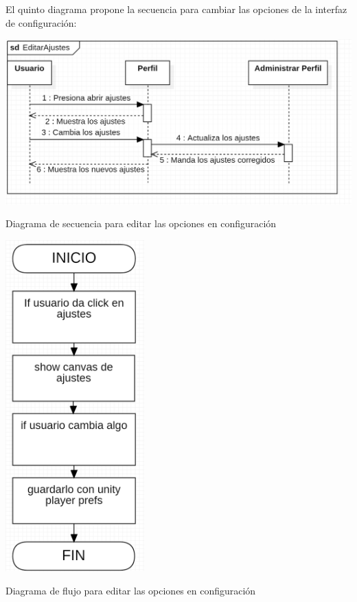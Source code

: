 \documentclass[12pt, oneside, letterpaper]{book}
\begin{document}
\bigskip
\fontsize{14}{18}\selectfont
\par 
El quinto diagrama propone la secuencia para cambiar las opciones de la interfaz de configuración:

\begin{center}
	\centering
		\includegraphics[width=1\textwidth]{DSFNEditarAjustes.png}

	\caption{Diagrama de secuencia para editar las opciones en configuración}
	\label{DSFNopcionesConfig}
\end{center}

\begin{center}
	\centering
		\includegraphics[width=0.4\textwidth]{DFFNEditarAjustes.png}

	\caption{Diagrama de flujo para editar las opciones en configuración}
	\label{DFFNopcionesConfig}
\end{center}
\end{document}
